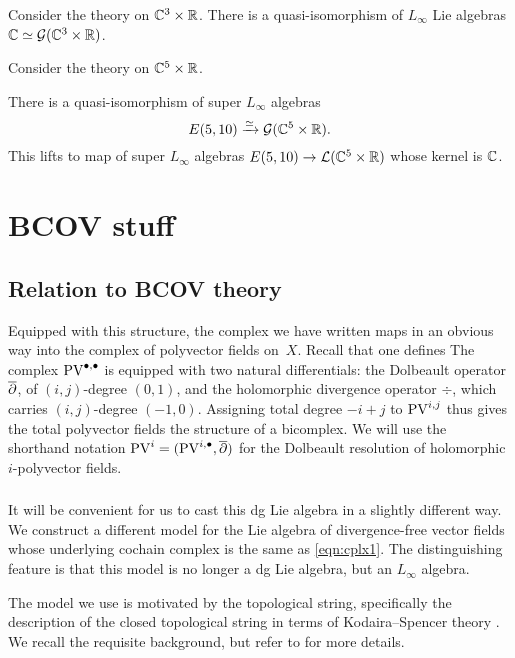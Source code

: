 \documentclass[11pt]{amsart}
\begin{document}
\parsec[]
Consider the theory on $\mathbb C^3 \times \mathbb R$. 
There is a quasi-isomorphism of $L_\infty$ Lie algebras $\mathbb C \simeq \mathcal G (\mathbb C^3 \times \mathbb R)$. 

\parsec[]
Consider the theory on $\mathbb C^5 \times \mathbb R$. 

\begin{prop}
There is a quasi-isomorphism of super $L_\infty$ algebras 
\[
E(5,10) \xrightarrow{\simeq} \mathcal G(\mathbb C^5 \times \mathbb R) .
\]
This lifts to map of super $L_\infty$ algebras $E(5,10) \to \mathcal L(\mathbb C^5 \times \mathbb R)$ whose kernel is $\mathbb C$.
\end{prop}


\section{BCOV stuff}

\subsection{Relation to BCOV theory}

\parsec[sec:pv] 
Equipped with this structure, the complex we have written maps in an obvious way into the complex of polyvector fields on~$X$. Recall that one defines
The complex ${\rm PV}^{\bullet,\bullet}$ is equipped with two natural differentials: the Dolbeault operator $\overline{\partial}$, of $(i,j)$-degree $(0,1)$, and the holomorphic divergence operator $\div$, which carries $(i,j)$-degree $(-1,0)$. Assigning total degree $- i + j$ to ${\rm PV}^{i,j}$ thus gives the total polyvector fields the structure of a bicomplex. We will use the shorthand notation ${\rm PV}^i = ({\rm PV}^{i,\bullet}, \overline{\partial} )$ for the Dolbeault resolution of holomorphic $i$-polyvector fields. 

\subsubsection{}
It will be convenient for us to cast this dg Lie algebra in a slightly different way.
We construct a different model for the Lie algebra of divergence-free vector fields whose underlying cochain complex is the same as \eqref{eqn:cplx1}. 
The distinguishing feature is that this model is no longer a dg Lie algebra, but an $L_\infty$ algebra. 

The model we use is motivated by the topological string, specifically the description of the closed topological string in terms of Kodaira--Spencer theory \cite{BCOV}.
We recall the requisite background, but refer to \cite{CLbcov1,CLbcov2,CLtypeI} for more details. 
\end{document}
